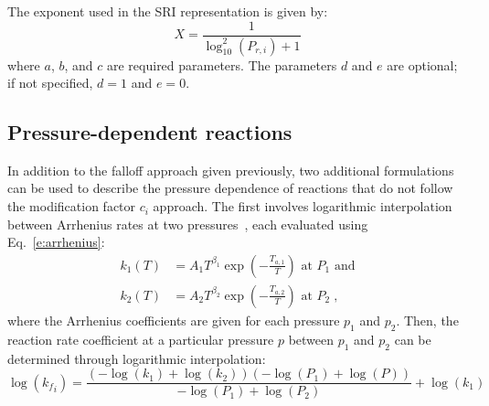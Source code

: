 \documentclass[12pt]{article}
\begin{document}
The exponent used in the SRI representation is given by:
\begin{equation}
 X = \frac{1}{\log_{10}^{2}{\left (P_{r, i} \right )} + 1}
\end{equation}
where $a$, $b$, and $c$ are required parameters.
The parameters $d$ and $e$ are optional; if not specified, $d = 1$ and $e = 0$.

\subsection{Pressure-dependent reactions}

In addition to the falloff approach given previously, two additional formulations can be used to describe the pressure dependence of reactions that do not follow the modification factor $c_i$ approach.
The first involves logarithmic interpolation between Arrhenius rates at two pressures~\cite{chemkin:2012,Goodwin:2015aa}, each evaluated using Eq.~\cref{e:arrhenius}:
\begin{align}
k_1 (T) &= A_1 T^{\beta_1} \exp \left( -\frac{T_{a, 1}}{T} \right) \text{ at } P_1 \text{ and} \label{e:plog_k1} \\
k_2 (T) &= A_2 T^{\beta_2} \exp \left( -\frac{T_{a, 2}}{T} \right) \text{ at } P_2 \;, \label{e:plog_k2}
\end{align}
where the Arrhenius coefficients are given for each pressure $p_1$ and $p_2$.
Then, the reaction rate coefficient at a particular pressure $p$ between $p_1$ and $p_2$ can be determined through logarithmic interpolation:
\begin{equation}
\log{\left ({k_f}_{i} \right )} = \frac{\left(- \log{\left (k_{1} \right )} + \log{\left (k_{2} \right )}\right) \left(- \log{\left (P_{1} \right )} + \log{\left (P \right )}\right)}{- \log{\left (P_{1} \right )} + \log{\left (P_{2} \right )}} + \log{\left (k_{1} \right )}
\end{equation}
\end{document}
